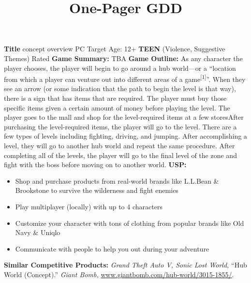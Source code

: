 \documentclass{article}
\title{One-Pager GDD}
\begin{document}
	{\Large %
		\noindent \textbf{Title} concept overview \newline \newline
		\noindent PC \newline
		\noindent Target Age: 12+ \newline
		\noindent \textbf{TEEN} (Violence, Suggestive Themes) Rated \newline \newline
		\noindent \textbf{Game Summary:}
		TBA \newline \newline %
		\noindent \textbf{Game Outline:}
		As any character the player chooses, the player will begin to go around a hub world---or a ``location from which a player can venture out into different areas of a game\textsuperscript{[1]}''. When they see an arrow (or some indication that the path to begin the level is that way), there is a sign that has items that are required. The player must buy those specific items given a certain amount of money before playing the level. The player goes to the mall and shop for the level-required items at a few stores\iffalse ; the player will understand a short course of marketing as they learn for themselves how they buy products like in the real world.\fi After purchasing the level-required items, the player will go to the level. There are a few types of levels including fighting, driving, and jumping. After accomplishing a level, they will go to another hub world and repeat the same procedure. After completing all of the levels, the player will go to the final level of the zone and fight with the boss before moving on to another world. \newline \newline
		\noindent \textbf{USP:}
		\begin{itemize}
			\item Shop and purchase products from real-world brands like L.L.Bean \& Brookstone to survive the wilderness and fight enemies
			\item Play multiplayer (locally) with up to 4 characters
			\item Customize your character with tons of clothing from popular brands like Old Navy \& Uniqlo
			\item Communicate with people to help you out during your adventure
		\end{itemize}
		\noindent \textbf{Similar Competitive Products:} \newline
		\textit{Grand Theft Auto V, Sonic Lost World, }
		\vfill
		\hrulefill
		\vspace{0.25cm} \newline
		[1] ``Hub World (Concept).'' \textit{Giant Bomb,} \href{www.giantbomb.com/hub-world/3015-1855/}{www.giantbomb.com/hub-world/3015-1855/}.
	}
\end{document}
